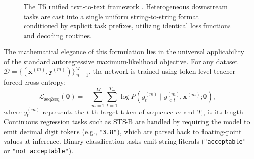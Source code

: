 \documentclass[../../main.tex]{subfiles}
\begin{document}
\begin{figure}[t]
\caption{The T5 unified text-to-text framework \cite{raffel2020t5}. Heterogeneous downstream tasks are cast into a single uniform string-to-string format conditioned by explicit task prefixes, utilizing identical loss functions and decoding routines.}
\label{fig:t5_architecture}
\end{figure}

The mathematical elegance of this formulation lies in the universal applicability of the standard autoregressive maximum-likelihood objective. For any dataset $\mathcal{D} = \{(\mathbf{x}^{(m)}, \mathbf{y}^{(m)})\}_{m=1}^M$, the network is trained using token-level teacher-forced cross-entropy:
\begin{equation}
\mathcal{L}_{\text{seq2seq}}(\boldsymbol{\theta}) = -\sum_{m=1}^M \sum_{t=1}^{T_m} \log P\left(y_t^{(m)} \mid y_{<t}^{(m)}, \mathbf{x}^{(m)}; \boldsymbol{\theta}\right),
\label{eq:t5_seq2seq_loss}
\end{equation}
where $y_t^{(m)}$ represents the $t$-th target token of sequence $m$ and $T_m$ is its length. Continuous regression tasks such as STS-B are handled by requiring the model to emit decimal digit tokens (e.g., \texttt{"3.8"}), which are parsed back to floating-point values at inference. Binary classification tasks emit string literals (\texttt{"acceptable"} or \texttt{"not acceptable"}).
\end{document}
